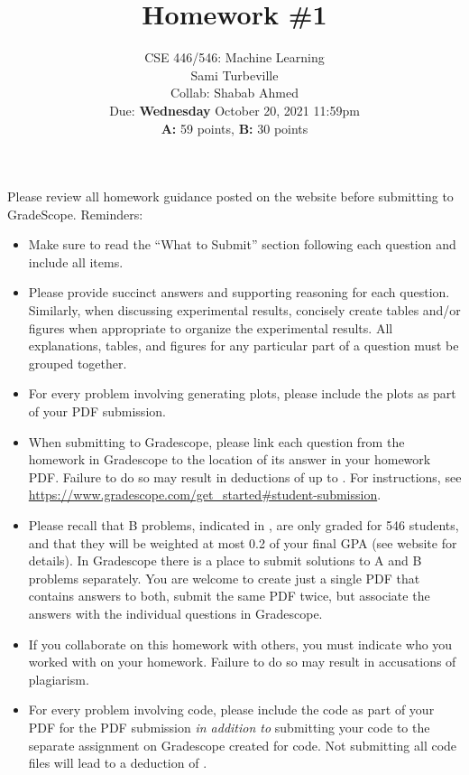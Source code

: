 \documentclass{article}
\begin{document}
\setcounter{aprob}{0}
\setcounter{bprob}{0}
\title{Homework \#1}
\author{
    \normalsize{CSE 446/546: Machine Learning}\\
    \normalsize{Sami Turbeville}\\
    \normalsize{Collab: Shabab Ahmed}\\
    \normalsize{Due: \textbf{Wednesday} October 20, 2021 11:59pm}\\
    \normalsize{\textbf{A:} 59 points, \textbf{B:} 30 points}
}
\date{{}}
\maketitle

\noindent Please review all homework guidance posted on the website before submitting to GradeScope. Reminders:
\begin{itemize}
    \item Make sure to read the ``What to Submit'' section following each question and include all items.
    \item Please provide succinct answers and supporting reasoning for each question. Similarly, when discussing experimental results, concisely create tables and/or figures when appropriate to organize the experimental results. All explanations, tables, and figures for any particular part of a question must be grouped together.
    \item For every problem involving generating plots, please include the plots as part of your PDF submission.
    \item When submitting to Gradescope, please link each question from the homework in Gradescope to the location of its answer in your homework PDF. Failure to do so may result in deductions of up to . For instructions, see \url{https://www.gradescope.com/get_started#student-submission}.
    \item Please recall that B problems, indicated in , are only graded for 546 students, and that they will be weighted at most 0.2 of your final GPA (see website for details). In Gradescope there is a place to submit solutions to A and B problems separately. You are welcome to create just a single PDF that contains answers to both, submit the same PDF twice, but associate the answers with the individual questions in Gradescope. 
    \item If you collaborate on this homework with others, you must indicate who you worked with on your homework. Failure to do so may result in accusations of plagiarism.
    \item For every problem involving code, please include the code as part of your PDF for the PDF submission \emph{in addition to} submitting your code to the separate assignment on Gradescope created for code. Not submitting all code files will lead to a deduction of .  
\end{itemize}
\end{document}
